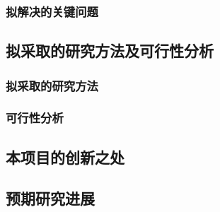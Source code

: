 \documentclass{ctexart}
\begin{document}
\subsubsection{拟解决的关键问题}
\subsection{拟采取的研究方法及可行性分析}
\subsubsection{拟采取的研究方法}
\subsubsection{可行性分析}

\subsection{本项目的创新之处}
\subsection{预期研究进展}
\end{document}
